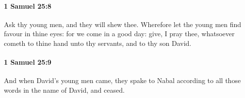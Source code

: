 		\paragraph{1 Samuel 25:8} %
			\label{1SAMUEL-25-8}

			Ask thy young men, and they will shew thee. Wherefore let the young men find favour in thine eyes: for we come in a good day: give, I pray thee, whatsoever cometh to thine hand unto thy servants, and to thy son David.


		\paragraph{1 Samuel 25:9} %
			\label{1SAMUEL-25-9}

			And when David’s young men came, they spake to Nabal according to all those words in the name of David, and ceased.


